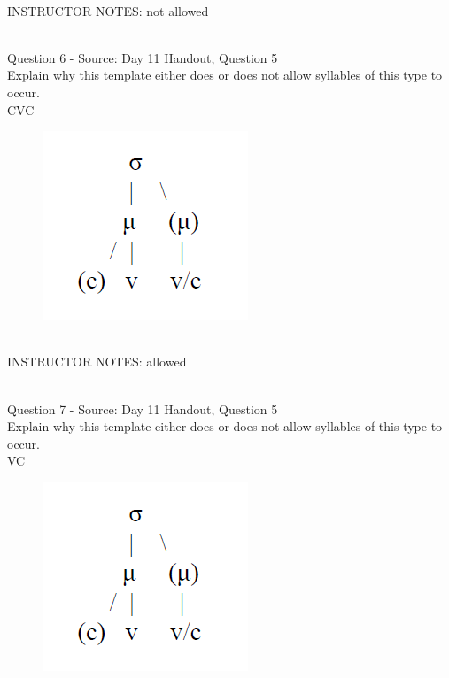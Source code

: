 \documentclass[12pt]{article}
\begin{document}
~\\
INSTRUCTOR NOTES: not allowed


~\\

{\large Question 6} - Source: Day 11 Handout, Question 5\\

Explain why this template either does or does not allow syllables of this type to occur.\\

CVC

\begin{figure}[H]
\includegraphics{../images/ponapean_syllabletemplate.png}
\end{figure}

~\\
INSTRUCTOR NOTES: allowed


~\\

{\large Question 7} - Source: Day 11 Handout, Question 5\\

Explain why this template either does or does not allow syllables of this type to occur.\\

VC

\begin{figure}[H]
\includegraphics{../images/ponapean_syllabletemplate.png}
\end{figure}
\end{document}
